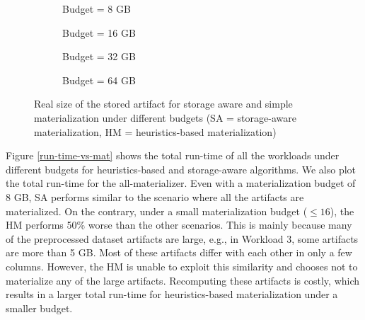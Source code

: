 \begin{figure}
\begin{subfigure}[b]{0.5\linewidth}
\centering
 \resizebox{\columnwidth}{!}{%
%
}
\caption{Budget = 8 GB}
\end{subfigure}%
\begin{subfigure}[b]{0.5\linewidth}
\centering
 \resizebox{\columnwidth}{!}{%
%
}

\caption{Budget = 16 GB}
\end{subfigure}
\begin{subfigure}[b]{0.5\linewidth}
\centering
 \resizebox{\columnwidth}{!}{%
%
}

\caption{Budget = 32 GB}
\end{subfigure}%
\begin{subfigure}[b]{0.5\linewidth}
\centering
 \resizebox{\columnwidth}{!}{%
%
}
\caption{Budget = 64 GB}
\end{subfigure}
\caption{Real size of the stored artifact for storage aware and simple materialization under different budgets (SA = storage-aware materialization, HM = heuristics-based materialization)  }
\label{exp-sa-vs-simple-size}
\end{figure}

Figure \ref{run-time-vs-mat} shows the total run-time of all the workloads under different budgets for heuristics-based and storage-aware algorithms.
We also plot the total run-time for the all-materializer.
Even with a materialization budget of 8 GB, SA performs similar to the scenario where all the artifacts are materialized.
On the contrary, under a small materialization budget ($\leq 16$), the HM performs 50\% worse than the other scenarios.
This is mainly because many of the preprocessed dataset artifacts are large, e.g., in Workload 3, some artifacts are more than 5 GB.
Most of these artifacts differ with each other in only a few columns.
However, the HM is unable to exploit this similarity and chooses not to materialize any of the large artifacts.
Recomputing these artifacts is costly, which results in a larger total run-time for heuristics-based materialization under a smaller budget.

